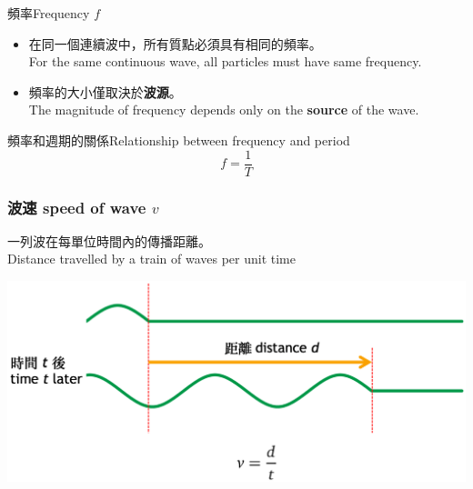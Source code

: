 \documentclass[beamer=true]{standalone}
\begin{document}
\begin{frame}{頻率Frequency $f$}
    \begin{itemize}
        \item 在同一個連續波中，所有質點必須具有相同的頻率。\\For the same continuous wave, all particles must have same frequency.
        \item 頻率的大小僅取決於\textbf{波源}。\\The magnitude of frequency depends only on the \textbf{source} of the wave.
    \end{itemize}\bigskip
    \begin{alertblock}{頻率和週期的關係Relationship between frequency and period}
        \[f=\frac{1}{T}\]
    \end{alertblock}
\end{frame}

\begin{frame}
    \frametitle{波速 speed of wave $v$}
    一列波在每單位時間內的傳播距離。\\Distance travelled by a train of waves per unit time
    \par{\par\centering\includegraphics[width=\textwidth]{./img/ch1_2024-05-08-15-14-23.png}\par}
\end{frame}
\end{document}
